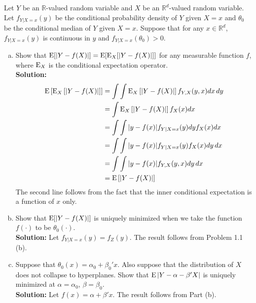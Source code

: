 \documentclass[11pt,letterpaper]{article}                  %
\begin{document}
\bigskip
\begin{problem}
Let $Y$ be an $\mathbb{R}$-valued random variable and $X$ be an $\mathbb{R}^d$-valued random variable.
Let $f_{Y|X=x} (y)$ be the conditional probability density of $Y$ given $X=x$ and $\theta_0$ be the conditional median of $Y$ given $X=x$.
Suppose that for any $x \in \mathbb{R}^d$, $f_{Y|X=x} (y)$ is continuous in $y$ and $f_{Y|X=x} (\theta_0) > 0$.
\begin{enumerate}[(a)]
	\item 
	Show that $\operatorname{E} [|Y - f(X)|] = \operatorname{E} [ \operatorname{E}_X [|Y - f(X)|]]$ for any measurable function $f$, where $\operatorname{E}_X$ is the conditional expectation operator. \\

	\textbf{Solution:}
	\begin{align*}
		\operatorname{E} \left[ \operatorname{E}_X \left[ |Y - f(X)| \right] \right] &= \int \int \operatorname{E}_X \left[ |Y - f(X)| \right] f_{Y,X} (y,x) dx \, dy\\
		&= \int \operatorname{E}_X \left[ |Y - f(X)| \right] f_X (x) dx \\
		&= \int \int |y - f(x)| f_{Y | X=x} (y) dy f_X (x) dx \\
		&= \int \int |y - f(x)| f_{Y | X=x} (y) f_X (x) dy \, dx \\
		&= \int \int |y - f(x)| f_{Y, X} (y,x) dy \, dx \\
		&= \operatorname{E} \left[ |Y - f(X)| \right]
	\end{align*}
	The second line follows from the fact that the inner conditional expectation is a function of $x$ only.

	\item 
	Show that $\operatorname{E} [|Y - f(X)|]$ is uniquely minimized when we take the function $f(\cdot)$ to be $\theta_0 (\cdot)$.
	\\

	\textbf{Solution:}
	Let $f_{Y|X=x} (y) = f_Z (y)$.
	The result follows from Problem 1.1 (b).

	\item 
	Suppose that $\theta_0(x) = \alpha_0 + \beta_0'x$.
	Also suppose that the distribution of $X$ does not collapse to hyperplanes.
	Show that $\operatorname{E} \left| Y - \alpha - \beta'X \right|$ is uniquely minimized at $\alpha = \alpha_0$, $\beta = \beta_0$.
	\\

	\textbf{Solution:} Let $f(x) = \alpha + \beta' x$.
	The result follows from Part (b).
\end{enumerate}
\end{problem}
\end{document}
